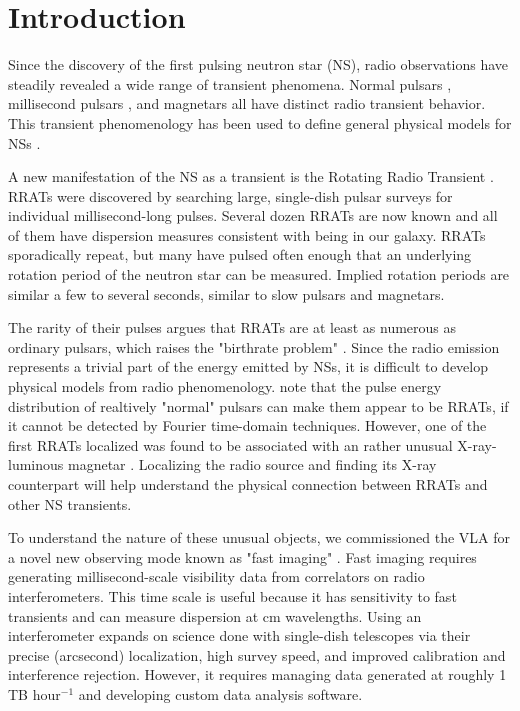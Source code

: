 \section{Introduction}

Since the discovery of the first pulsing neutron star (NS), radio observations have steadily revealed a wide range of transient phenomena. Normal pulsars \citep{HEWISH_1969}, millisecond pulsars \citep{Backer_1982}, and magnetars \citep{Camilo_2006} all have distinct radio transient behavior. This transient phenomenology has been used to define general physical models for NSs \citep{Perna_2011}.

A new manifestation of the NS as a transient is the Rotating Radio Transient \citep[RRAT;][]{McLaughlin_2006}. RRATs were discovered by searching large, single-dish pulsar surveys for individual millisecond-long pulses. Several dozen RRATs are now known \citep{Deneva_2009, Burke_Spolaor_2010, Keane_2011} and all of them have dispersion measures consistent with being in our galaxy. RRATs sporadically repeat, but many have pulsed often enough that an underlying rotation period of the neutron star can be measured. Implied rotation periods are similar a few to several seconds, similar to slow pulsars and magnetars.

The rarity of their pulses argues that RRATs are at least as numerous as ordinary pulsars, which raises the "birthrate problem" \citep{Keane_2011}. Since the radio emission represents a trivial part of the energy emitted by NSs, it is difficult to develop physical models from radio phenomenology. \citep{Weltevrede_2006} note that the pulse energy distribution of realtively "normal" pulsars can make them appear to be RRATs, if it cannot be detected by Fourier time-domain techniques. However, one of the first RRATs localized was found to be associated with an rather unusual X-ray-luminous magnetar \citep{Lyne_2009}. Localizing the radio source and finding its X-ray counterpart will help understand the physical connection between RRATs and other NS transients.

To understand the nature of these unusual objects, we commissioned the VLA for a novel new observing mode known as "fast imaging" \citep{Law_2011}. Fast imaging requires generating millisecond-scale visibility data from correlators on radio interferometers.
This time scale is useful because it has sensitivity to fast transients and can measure dispersion at cm wavelengths. Using an interferometer expands on science done with single-dish telescopes via their precise (arcsecond) localization, high survey speed, and improved calibration and interference rejection. However, it requires managing data generated at roughly 1 TB hour$^{-1}$ and developing custom data analysis software.

